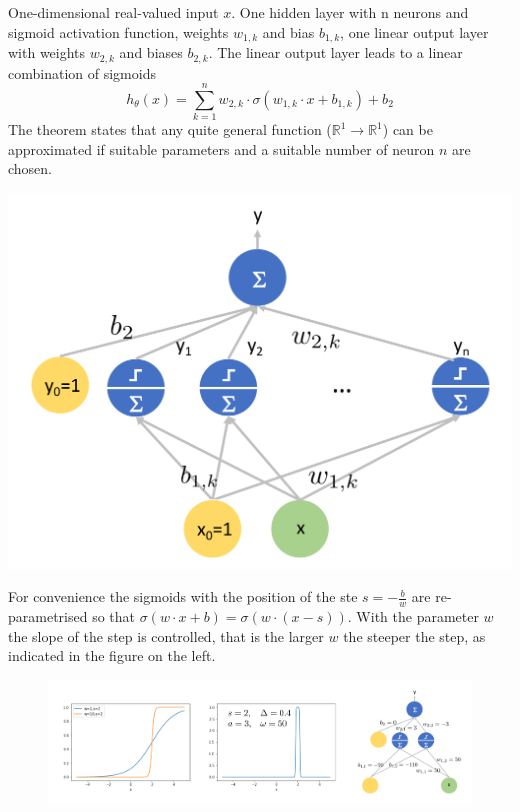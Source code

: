 \documentclass[11pt]{article}
\begin{document}
\noindent
\begin{minipage}{0.6\linewidth}
	One-dimensional real-valued input $x$. One hidden layer with n neurons and sigmoid activation function, weights $w_{1,k}$ and bias $b_{1,k}$, one linear output layer with weights $w_{2,k}$ and biases $b_{2,k}$. The linear output layer leads to a linear combination of sigmoids
	\begin{equation*}
		h_\theta(x) = \sum_{k=1}^{n} w_{2,k}\cdot\sigma(w_{1,k}\cdot x + b_{1,k}) + b_2
	\end{equation*}
	The theorem states that any quite general function ($\mathbb{R}^1\rightarrow\mathbb{R}^1$) can be approximated if suitable parameters and a suitable number of neuron $n$ are chosen.
\end{minipage}
\begin{minipage}{0.4\linewidth}
	\centering
	\includegraphics[width=\linewidth,keepaspectratio]{1d_function_approximation}
\end{minipage}

\vspace{1em}
\noindent
For convenience the sigmoids with the position of the ste $s = -\frac{b}{w}$ are re-parametrised so that $\sigma(w\cdot x + b) = \sigma(w\cdot(x-s))$. With the parameter $w$ the slope of the step is controlled, that is the larger $w$ the steeper the step, as indicated in the figure on the left.

\begin{figure}[H]
	\centering
	\includegraphics[width=0.8\linewidth,keepaspectratio]{1d_function_approximation_example}
\end{figure}
\end{document}
